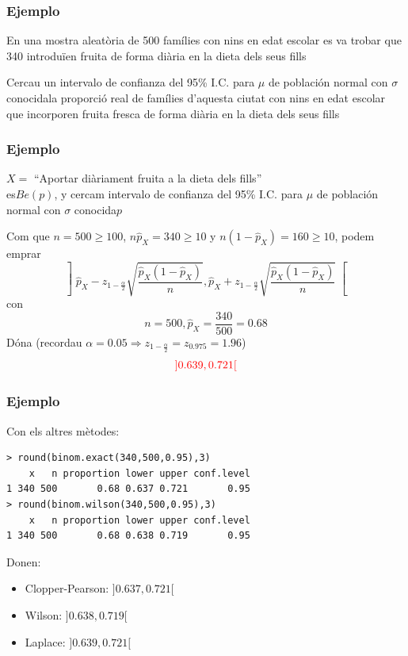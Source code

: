 \documentclass[12pt,t]{beamer}\usepackage[]{graphicx}\usepackage[]{color}
\newcommand{\red}[1]{\textcolor{red}{#1}}
\renewcommand{\geq}{\geqslant}
\theoremstyle{plain}
\theoremstyle{definition}
\begin{document}
\begin{frame}
\frametitle{Ejemplo}

En una mostra aleatòria de 500 famílies con nins en edat escolar es
va trobar que 340 introduïen fruita de forma diària en la dieta dels seus fills
\medskip

Cercau un intervalo de confianza  del 95\% I.C. para $\mu$ de población normal con $\sigma$ conocidala proporció real de
famílies d'aquesta ciutat con nins en edat escolar que incorporen fruita fresca de
forma diària en la dieta dels seus fills


\end{frame}
\begin{frame}
\frametitle{Ejemplo}

$X=$ ``Aportar diàriament fruita a la dieta dels fills''\\
 es$Be(p)$, y cercam intervalo de confianza  del 95\% I.C. para $\mu$ de población normal con $\sigma$ conocida$p$
\bigskip

Com que $n=500\geq 100$, $n\widehat{p}_X=340\geq 10$ y $n(1-\widehat{p}_X)=160\geq 10$, podem emprar
$$
\left]\widehat{p}_{X}-z_{1-\frac{\alpha}{2}}\sqrt{\frac{\widehat{p}_{X}
(1-\widehat{p}_{X})}{n}},
\widehat{p}_{X}+z_{1-\frac{\alpha}{2}}\sqrt{\frac{\widehat{p}_{X}
(1-\widehat{p}_{X})}{n}}\right[
$$
con
$$
n=500, \widehat{p}_{X}=\dfrac{340}{500}=0.68
$$
Dóna (recordau $\alpha=0.05\Rightarrow z_{1-\frac{\alpha}{2}}=z_{0.975}=1.96$)
$$
\red{]0.639,0.721[}
$$

\end{frame}

\begin{frame}[fragile]
\frametitle{Ejemplo}

Con els altres mètodes:
\begin{verbatim}
> round(binom.exact(340,500,0.95),3)
    x   n proportion lower upper conf.level
1 340 500       0.68 0.637 0.721       0.95
> round(binom.wilson(340,500,0.95),3)
    x   n proportion lower upper conf.level
1 340 500       0.68 0.638 0.719       0.95
\end{verbatim}
Donen:
\medskip

\begin{itemize}
\item Clopper-Pearson: $]0.637,0.721[$
\medskip

\item Wilson: $]0.638, 0.719[$
\medskip

\item Laplace: $]0.639,0.721[$
\end{itemize}

\end{frame}
\end{document}
